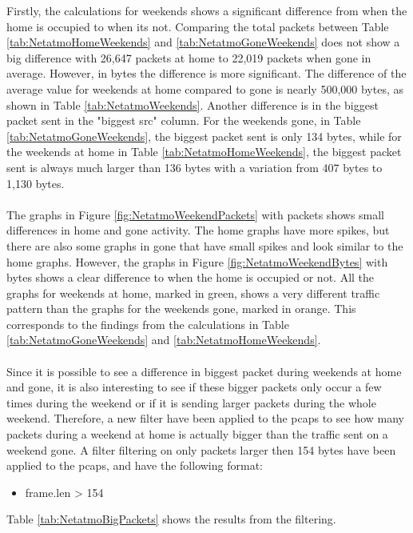 Firstly, the calculations for weekends shows a significant difference from when the home is occupied to when its not. Comparing the total packets between Table \ref{tab:NetatmoHomeWeekends} and \ref{tab:NetatmoGoneWeekends} does not show a big difference with 26,647 packets at home to 22,019 packets when gone in average. However, in bytes the difference is more significant. The difference of the average value for weekends at home compared to gone is nearly 500,000 bytes, as shown in Table \ref{tab:NetatmoWeekends}. Another difference is in the biggest packet sent in the "biggest src" column. For the weekends gone, in Table \ref{tab:NetatmoGoneWeekends}, the biggest packet sent is only 134 bytes, while for the weekends at home in Table \ref{tab:NetatmoHomeWeekends}, the biggest packet sent is always much larger than 136 bytes with a variation from 407 bytes to 1,130 bytes.
\\\\
The graphs in Figure \ref{fig:NetatmoWeekendPackets} with packets shows small differences in home and gone activity. The home graphs have more spikes, but there are also some graphs in gone that have small spikes and look similar to the home graphs. However, the graphs in Figure \ref{fig:NetatmoWeekendBytes} with bytes shows a clear difference to when the home is occupied or not. All the graphs for weekends at home, marked in green, shows a very different traffic pattern than the graphs for the weekends gone, marked in orange. This corresponds to the findings from the calculations in Table \ref{tab:NetatmoGoneWeekends} and \ref{tab:NetatmoHomeWeekends}.
\\\\
Since it is possible to see a difference in biggest packet during weekends at home and gone, it is also interesting to see if these bigger packets only occur a few times during the weekend or if it is sending larger packets during the whole weekend. Therefore, a new filter have been applied to the pcaps to see how many packets during a weekend at home is actually bigger than the traffic sent on a weekend gone. A filter filtering on only packets larger then 154 bytes have been applied to the pcaps, and have the following format:

\begin{itemize}
    \item frame.len > 154
\end{itemize}

Table \ref{tab:NetatmoBigPackets} shows the results from the filtering. 

